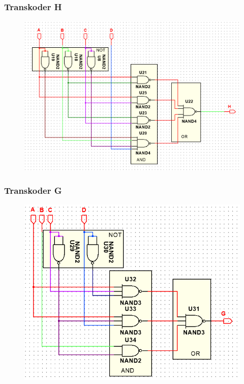 \documentclass[a4paper]{article}
\begin{document}
\subsubsection{Transkoder H}
\begin{figure}[H]
 \centering
 \includegraphics{schemat_H.png}
\end{figure}

\subsubsection{Transkoder G}
\begin{figure}[H]
 \centering
 \includegraphics{schemat_G.png}
\end{figure}
\end{document}
